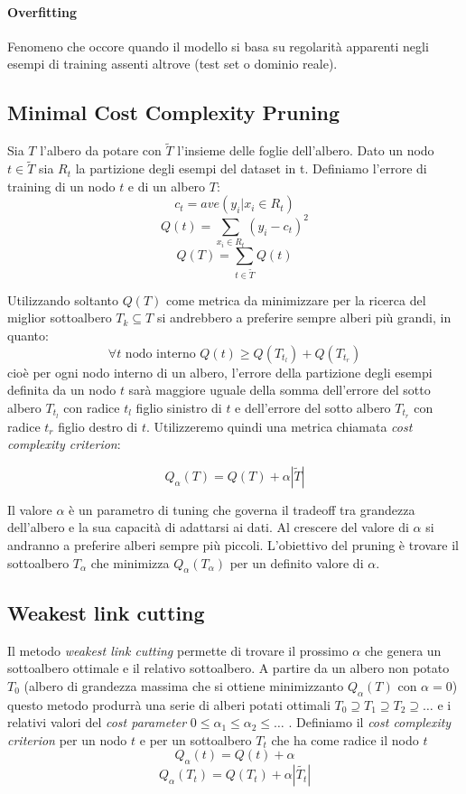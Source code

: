 \documentclass{article}
\begin{document}
  \paragraph{Overfitting} Fenomeno che occore quando il modello
  si basa su regolarità apparenti negli esempi di training
  assenti altrove (test set o dominio reale).\\

    \subsection{Minimal Cost Complexity Pruning}
    Sia $T$ l'albero da potare con $\tilde{T}$ l'insieme delle foglie dell'albero.
    Dato un nodo $t \in \tilde{T}$ sia $R_t$ la partizione degli esempi del dataset in t.
    Definiamo l'errore di training di un nodo $t$ e di un albero $T$:
    \[
        c_t = ave(y_i|x_i \in R_t)
    \]
    \[
        Q(t) = \sum_{x_i \in R_t}{(y_i - c_t)^2}
    \]
    \[
        Q(T) = \sum_{t \in \tilde{T}}{Q(t)}
    \]

    Utilizzando soltanto $Q(T)$ come metrica da minimizzare per la ricerca 
    del miglior sottoalbero $T_k \subseteq T$ si andrebbero a preferire sempre
    alberi più grandi, in quanto: 
    \[\forall t \text{ nodo interno } Q(t) \geq Q(T_{t_l}) + Q(T_{t_r})\]
    cioè per ogni nodo interno di un albero, l'errore della partizione 
    degli esempi definita da un nodo $t$ sarà maggiore uguale della somma
    dell'errore del sotto albero $T_{t_l}$ con radice $t_l$ figlio sinistro
    di $t$ e dell'errore del sotto albero $T_{t_r}$ con radice $t_r$ figlio destro
    di $t$. Utilizzeremo quindi una metrica chiamata \textit{cost complexity criterion}:

    \[
      Q_\alpha(T) = Q(T) + \alpha|\tilde{T}|
    \]

    Il valore $\alpha$ è un parametro di tuning che governa il tradeoff
    tra grandezza dell'albero e la sua capacità di adattarsi 
    ai dati. Al crescere del valore di $\alpha$ si andranno a preferire
    alberi sempre più piccoli. L'obiettivo del pruning è trovare 
    il sottoalbero $T_\alpha$ che minimizza $Q_\alpha(T_\alpha)$ per un
    definito valore di $\alpha$.
    
    \subsection{Weakest link cutting}
    Il metodo \textit{weakest link cutting} permette di trovare il prossimo
    $\alpha$ che genera un sottoalbero ottimale e il relativo sottoalbero.
    A partire da un albero non potato $T_0$ (albero di grandezza massima
    che si ottiene minimizzanto $Q_\alpha(T)$ con $\alpha=0$) questo metodo
    produrrà una
    serie di alberi potati ottimali $T_0 \supseteq T_1 \supseteq T_2 \supseteq \ldots$ e i relativi
    valori del \textit{cost parameter}  $0 \leq \alpha_1 \leq \alpha_2 \leq \ldots$ .
    Definiamo il \textit{cost complexity criterion} per 
    un nodo $t$ e per un sottoalbero $T_t$ che ha come radice il nodo $t$
    \[
        Q_\alpha(t) = Q(t) + \alpha  
    \]
    \[
        Q_\alpha(T_t) = Q(T_t) + \alpha|\tilde{T_t}|
    \]
\end{document}
